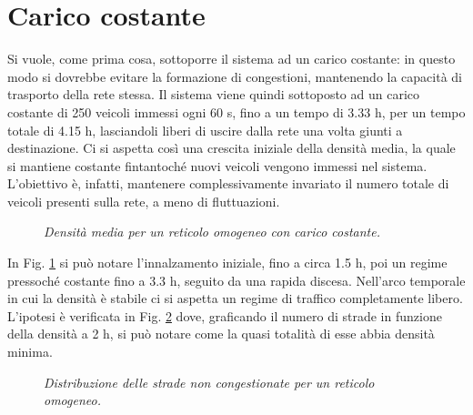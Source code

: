\documentclass[../main.tex]{subfiles}
\begin{document}
\section{Carico costante}
Si vuole, come prima cosa, sottoporre il sistema ad un carico costante: in questo modo si dovrebbe evitare la formazione di congestioni, mantenendo la capacit\`a di trasporto della rete stessa.
Il sistema viene quindi sottoposto ad un carico costante di 250 veicoli immessi ogni 60 s, fino a un tempo di 3.33 h, per un tempo totale di 4.15 h, lasciandoli liberi di uscire dalla rete una volta giunti a destinazione.
Ci si aspetta cos\`i una crescita iniziale della densit\`a media, la quale si mantiene costante fintantoch\'e nuovi veicoli vengono immessi nel sistema.
L'obiettivo \`e, infatti, mantenere complessivamente invariato il numero totale di veicoli presenti sulla rete, a meno di fluttuazioni.
\begin{figure}[H]
    \centering
    \caption[Densit\`a media per un reticolo omogeneo con carico costante]{\emph{Densit\`a media per un reticolo omogeneo con carico costante.}}
    \label{fig:density_constant_homo}
\end{figure}
In Fig. \ref{fig:density_constant_homo} si pu\`o notare l'innalzamento iniziale, fino a circa 1.5 h, poi un regime pressoch\'e costante fino a 3.3 h, seguito da una rapida discesa.
Nell'arco temporale in cui la densit\`a \`e stabile ci si aspetta un regime di traffico completamente libero.
L'ipotesi \`e verificata in Fig. \ref{fig:nStreet_density_constant_homo} dove, graficando il numero di strade in funzione della densit\`a a 2 h, si pu\`o notare come la quasi totalit\`a di esse abbia densit\`a minima.
\begin{figure}[H]
    \centering
    \caption[Distribuzione delle strade non congestionate per un reticolo omogeneo.]{\emph{Distribuzione delle strade non congestionate per un reticolo omogeneo.}}
    \label{fig:nStreet_density_constant_homo}
\end{figure}
\end{document}
